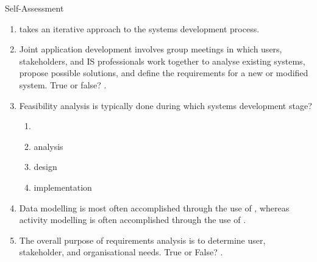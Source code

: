 \documentclass[\main/notes.tex]{subfiles}
\begin{document}
\begin{exercise}{Self-Assessment}
\begin{enumerate}
					\item {} takes an iterative approach to the systems development process.
					\item Joint application development involves group meetings in which users, stakeholders, and IS professionals work together to analyse existing systems, propose possible solutions, and define the requirements for a new or modified system. True or false? .
					\item Feasibility analysis is typically done during which systems development stage?
						\begin{enumerate}[label=\alph*., nosep]
							\item[\refstepcounter{enumii}\Circled{\alph{enumii}}] 
							\item analysis
							\item design
							\item implementation
						\end{enumerate}
					\item Data modelling is most often accomplished through the use of , whereas activity modelling is often accomplished through the use of .
					\item The overall purpose of requirements analysis is to determine user, stakeholder, and organisational needs. True or False? .
				\end{enumerate}
			\end{exercise}

	\vbox{}
\end{document}
